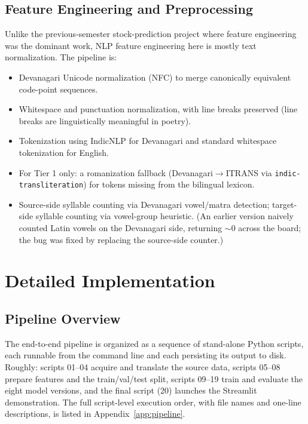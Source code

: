 \documentclass[11pt]{article}
\begin{document}
\subsection{Feature Engineering and Preprocessing}
Unlike the previous-semester stock-prediction project where feature engineering was the dominant work, NLP feature engineering here is mostly text normalization. The pipeline is:
\begin{itemize}[leftmargin=*,topsep=0pt]
  \item Devanagari Unicode normalization (NFC) to merge canonically equivalent code-point sequences.
  \item Whitespace and punctuation normalization, with line breaks preserved (line breaks are linguistically meaningful in poetry).
  \item Tokenization using IndicNLP for Devanagari and standard whitespace tokenization for English.
  \item For Tier 1 only: a romanization fallback (Devanagari$\rightarrow$ITRANS via \texttt{indic-transliteration}) for tokens missing from the bilingual lexicon.
  \item Source-side syllable counting via Devanagari vowel/matra detection; target-side syllable counting via vowel-group heuristic. (An earlier version naively counted Latin vowels on the Devanagari side, returning $\sim$0 across the board; the bug was fixed by replacing the source-side counter.)
\end{itemize}

\section{Detailed Implementation}

\subsection{Pipeline Overview}
The end-to-end pipeline is organized as a sequence of stand-alone Python scripts, each runnable from the command line and each persisting its output to disk. Roughly: scripts 01--04 acquire and translate the source data, scripts 05--08 prepare features and the train/val/test split, scripts 09--19 train and evaluate the eight model versions, and the final script (20) launches the Streamlit demonstration. The full script-level execution order, with file names and one-line descriptions, is listed in Appendix~\ref{app:pipeline}.
\end{document}
